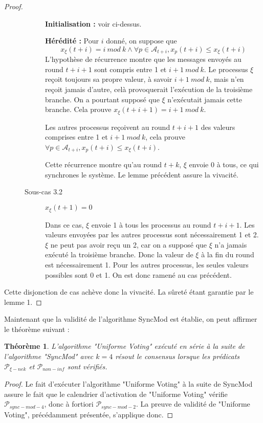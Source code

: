 \documentclass{article}
\newtheorem{theorem}{Théorème}
\begin{document}
\begin{proof}
\begin{description}
\begin{description}
					\textbf{Initialisation : } voir ci-dessus.

					\textbf{Hérédité : } Pour $i$ donné, on suppose que 
					$$x_\xi(t+i) = i~mod~k \wedge \forall p \in \mathcal{A}_{t+i}, x_p(t+i) \leq x_\xi(t+i)$$
					L'hypothèse de récurrence montre que les messages envoyés au round $t+i+1$ sont compris entre 1 et $i+1~mod~k$.
					Le processus $\xi$ reçoit toujours sa propre valeur, à savoir $i+1~mod~k$, mais n'en reçoit jamais d'autre, celà provoquerait l'exécution de la troisième branche.
					On a pourtant supposé que $\xi$ n'exécutait jamais cette branche. Cela prouve $x_\xi(t+i+1) = i+1~mod~k$.

					Les autres processus reçoivent au round $t+i+1$ des valeurs comprises entre 1 et $i+1~mod~k$, cela prouve $\forall p \in \mathcal{A}_{t+i}, x_p(t+i) \leq x_\xi(t+i)$.

					Cette récurrence montre qu'au round $t+k$, $\xi$ envoie 0 à tous, ce qui synchrones le système. Le lemme précédent assure la vivacité.

				\item[Sous-cas 3.2] $x_\xi(t+1) = 0$

					Dans ce cas, $\xi$ envoie 1 à tous les processus au round $t+i+1$. Les valeurs envoyées par les autres processus sont nécessairement 1 et 2.
					$\xi$ ne peut pas avoir reçu un 2, car on a supposé que $\xi$ n'a jamais exécuté la troisième branche. Donc la valeur de $\xi$ à la fin du round est nécessairement 1.
					Pour les autres processus, les seules valeurs possibles sont 0 et 1. On est donc ramené au cas précédent.
			\end{description}
	\end{description}

	Cette disjonction de cas achève donc la vivacité. La sûreté étant garantie par le lemme 1.
\end{proof}

Maintenant que la validité de l'algorithme SyncMod est établie, on peut affirmer le théorème suivant :

\begin{theorem}
	L'algorithme "Uniforme Voting" exécuté en série à la suite de l'algorithme "SyncMod" avec $k = 4$
	résout le consensus lorsque les prédicats $\mathcal{P}_{\xi-nek}$ et $\mathcal{P}_{non-inf}$ sont vérifiés.
\end{theorem}
\begin{proof}
	Le fait d'exécuter l'algorithme "Uniforme Voting" à la suite de SyncMod assure le fait que le calendrier d'activation de "Uniforme Voting" vérifie $\mathcal{P}_{sync-mod-4}$,
	donc à fortiori $\mathcal{P}_{sync-mod-2}$.
	La preuve de validité de "Uniforme Voting", précédamment présentée, s'applique donc.
\end{proof}
\end{document}
